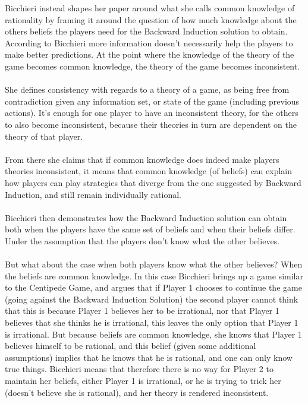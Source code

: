 \documentclass{article}
\begin{document}
Bicchieri instead shapes her paper around what she calls common knowledge of rationality by framing it around the question of how much knowledge about the others beliefs the players need for the Backward Induction solution to obtain. According to Bicchieri more information doesn't necessarily help the players to make better predictions. At the point where the knowledge of the theory of the game becomes common knowledge, the theory of the game becomes inconsistent.
\\
\\
She defines consistency with regards to a theory of a game, as being free from contradiction given any information set, or state of the game (including previous actions). It's enough for one player to have an inconsistent theory, for the others to also become inconsistent, because their theories in turn are dependent on the theory of that player.
\\
\\
From there she claims that if common knowledge does indeed make players theories inconsistent, it means that common knowledge (of beliefs) can explain how players can play strategies that diverge from the one suggested by Backward Induction, and still remain individually rational.
\\
\\
Bicchieri then demonstrates how the Backward Induction solution can obtain both when the players have the same set of beliefs and when their beliefs differ. Under the assumption that the players don't know what the other believes.
\\
\\
But what about the case when both players know what the other believes? When the beliefs are common knowledge. In this case Bicchieri brings up a game similar to the Centipede Game, and argues that if Player 1 chooses to continue the game (going against the Backward Induction Solution) the second player cannot think that this is because Player 1 believes her to be irrational, nor that Player 1 believes that she thinks he is irrational, this leaves the only option that Player 1 is irrational. But because beliefs are common knowledge, she knows that Player 1 believes himself to be rational, and this belief (given some additional assumptions) implies that he knows that he is rational, and one can only know true things. Bicchieri means that therefore there is no way for Player 2 to maintain her beliefs, either Player 1 is irrational, or he is trying to trick her (doesn't believe she is rational), and her theory is rendered inconsistent. 
\end{document}
